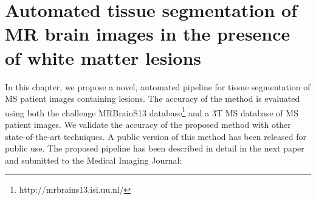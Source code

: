 
\chapter{Automated tissue segmentation of MR brain images in the presence of white
matter lesions}  

\label{chapter:chapter_6}

In this chapter, we propose a novel, automated pipeline for tissue segmentation of MS patient images containing lesions. The accuracy of the method is evaluated using both the challenge MRBrainS13 database\footnote{http://mrbrains13.isi.uu.nl/} and a 3T MS database of MS patient images. We validate the accuracy of the proposed method with other state-of-the-art techniques. A public version of this method has been released for public use.  The proposed pipeline has been described in detail in the next paper and submitted to the Medical Imaging Journal:

\vspace{2cm}

\noindent{}


%





